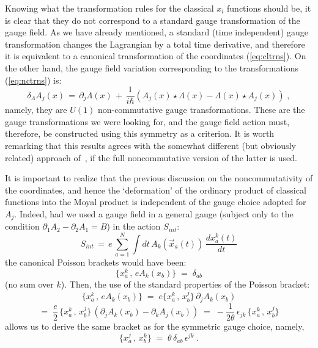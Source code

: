 \documentclass[a4paper,12pt]{article}
\begin{document}
Knowing what the transformation rules for the classical $x_i$
functions should be, it is clear that they do not correspond to a
standard gauge transformation of the gauge field. As we have
already
mentioned, a standard (time independent) gauge transformation
changes
the Lagrangian by a total time derivative, and therefore it is
equivalent to a canonical transformation of the coordinates
(\ref{eq:cltrns}).  On the other hand, the gauge field variation
corresponding to the transformations (\ref{eq:nctrns}) is:
\begin{equation}
  \label{eq:ncgt}
\delta_\Lambda  A_j(x) \,=\, \partial_j \Lambda (x)\,+\, \frac{1}{i
\hbar} \left( A_j (x) \star 
\Lambda (x) - \Lambda (x) \star A_j (x) \right) \;,   
\end{equation}
namely, they are $U(1)$ non-commutative gauge transformations.
These
are the gauge transformations we were looking for, and the gauge
field
action must, therefore, be constructed using this symmetry as a
criterion. It is worth remarking that this results agrees with the
somewhat different (but obviously related) approach
of~\cite{susskind}, if the full noncommutative version of the
latter
is used.

It is important to realize that the previous discussion on the
noncommutativity of the coordinates, and hence the `deformation' of
the ordinary product of classical functions into the Moyal product
is
independent of the gauge choice adopted for $A_j$. Indeed, had we
used
a gauge field in a general gauge (subject only to the condition
$\partial_1
A_2 - \partial_2 A_1 = B$) in the action $S_{int}$:
\begin{equation}
  \label{eq:gensint}
S_{int} \,=\, e\, \sum_{a=1}^N \int dt \,A_k({\vec x}_a (t))\,
\frac{dx^k_a(t)}{dt} 
\end{equation}
the canonical Poisson brackets would have been:
\begin{equation}
  \label{eq:gensint1}
  \{ x_a^k \,,\, e A_k (x_b) \} \;=\; \delta_{ab}  
\end{equation}
(no sum over $k$). Then, the use of the standard properties of the
Poisson bracket:
$$
\{ x^k_a \,,\, e A_k(x_b) \} \;=\; e \{ x^k_a \,,\,x^j_b
\}\,\partial_j
A_k(x_b)
$$
\begin{equation}
  \label{eq:gensint2}
=\;\frac{e}{2} \,\{ x^k_a \,,\,x^j_b \}\,(\partial_j A_k(x_b) -
\partial_k A_j(x_b)) 
\;=\; -\frac{1}{2\theta} \,\epsilon_{jk}\, \{ x^k_a \,,\,x^j_b \} 
\end{equation}
allows us to derive the same bracket as for the symmetric gauge
choice, namely,
\begin{equation}
  \label{eq:cpb}
\{ x^j_a \,,\, x^k_b \} \;=\; \theta \, \delta_{ab}\, \epsilon^{jk}
\;.
\end{equation}
\end{document}
